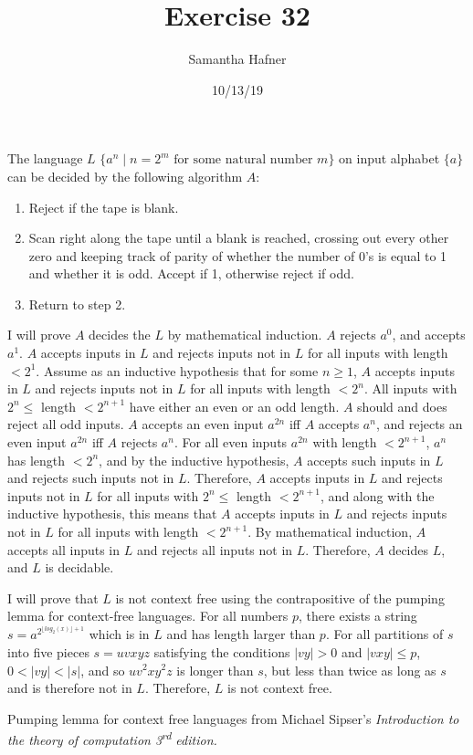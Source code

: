 \documentclass[12pt]{article}
\title{Exercise 32}
\author{Samantha Hafner}
\date{10/13/19}
\begin{document}
\maketitle


The language $L$ $\{a^n\;|\;n=2^m \textrm{ for some natural number } m\}$ on input alphabet $\{a\}$ can be decided by the following algorithm $A$:
\begin{enumerate}
\itemsep-.3em
\item Reject if the tape is blank.
\item Scan right along the tape until a blank is reached, crossing out every other zero and keeping track of parity of whether the number of $0$'s is equal to 1 and whether it is odd. Accept if 1, otherwise reject if odd.
\item Return to step 2.
\end{enumerate}
I will prove $A$ decides the $L$ by mathematical induction. $A$ rejects $a^0$, and accepts $a^1$. $A$ accepts inputs in $L$ and rejects inputs not in $L$ for all inputs with length $< 2^1$. 
Assume as an inductive hypothesis that for some $n \ge 1$, $A$ accepts inputs in $L$ and rejects inputs not in $L$ for all inputs with length $< 2^n$. All inputs with $2^n \le$ length $< 2^{n+1}$ have either an even or an odd length. $A$ should and does reject all odd inputs. $A$ accepts an even input $a^{2n}$ iff $A$ accepts $a^n$, and rejects an even input $a^{2n}$ iff $A$ rejects $a^n$. For all even inputs $a^{2n}$ with length $< 2^{n+1}$, $a^n$ has length $< 2^n$, and by the inductive hypothesis, $A$ accepts such inputs in $L$ and rejects such inputs not in $L$. Therefore, $A$ accepts inputs in $L$ and rejects inputs not in $L$ for all inputs with $2^n \le$ length $< 2^{n+1}$, and along with the inductive hypothesis, this means that $A$ accepts inputs in $L$ and rejects inputs not in $L$ for all inputs with length $< 2^{n+1}$. By mathematical induction, $A$ accepts all inputs in $L$ and rejects all inputs not in $L$. Therefore, $A$ decides $L$, and $L$ is decidable.

I will prove that $L$ is not context free using the contrapositive of the pumping lemma for context-free languages.
For all numbers $p$, there exists a string $s = a^{2^{\lfloor log_2(x)\rfloor+1}}$ which is in $L$ and has length larger than $p$. For all partitions of $s$ into five pieces $s = uvxyz$ satisfying the conditions $|vy| > 0$ and $|vxy| \le p$, $0 < |vy| < |s|$, and so $uv^2xy^2z$ is longer than $s$, but less than twice as long as $s$ and is therefore not in $L$. Therefore, $L$ is not context free.

Pumping lemma for context free languages from Michael Sipser's \textit{Introduction to the theory of computation 3\textsuperscript{rd} edition.}
\end{document}

